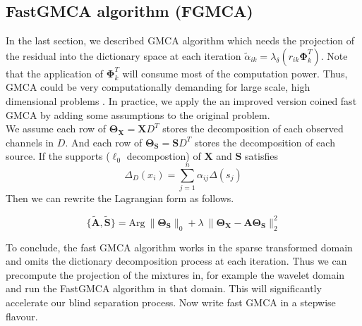 \subsection{FastGMCA algorithm (FGMCA)}
In the last section, we described GMCA algorithm which needs the projection of the residual into the dictionary space at each iteration $\tilde{\alpha}_{ik} = \lambda_{\delta}(r_{ik}\mathbf{\Phi}_k^T)$. Note that the application of $\mathbf{\Phi}_k^T$ will consume most of the computation power. Thus, GMCA could be very computationally demanding for large scale, high dimensional problems \cite{BobinJ_2007SaMD}. In practice, we apply the an improved version coined fast GMCA by adding some assumptions to the original problem.\\

We assume each row of $\mathbf{\Theta_X}=\mathbf{X}D^T$ stores the decomposition of each observed channels in $D$. And each row of $\mathbf{\Theta_S}=\mathbf{S}D^T$ stores the decomposition of each source. 
If the supports ($\ell_0$ decompostion) of $\mathbf{X}$ and $\mathbf{S}$ satisfies 
\begin{equation}
    \Delta_D(x_i) = \sum_{j=1}^{n}\alpha_{ij}\Delta(s_j)
\end{equation}
Then we can rewrite the Lagrangian form as follows.

\begin{equation}
    \{\mathbf{\tilde{A},\tilde{S}}\} = \text{Arg} \: 
    \lVert \mathbf{\Theta_S} \rVert_0 + \lambda \:\lVert \mathbf{\Theta_X} - \mathbf{A\Theta_S} \rVert^2_2
\label{fast-gmca}
\end{equation}

To conclude, the fast GMCA algorithm works in the sparse transformed domain and omits the dictionary decomposition process at each iteration. Thus we can precompute the projection of the mixtures in, for example the wavelet domain and run the FastGMCA algorithm in that domain. This will significantly accelerate our blind separation process. Now write fast GMCA in a stepwise flavour.

